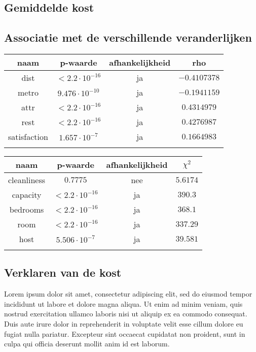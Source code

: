 \documentclass[a4paper]{kulakarticle}
\begin{document}
	\subsection{Gemiddelde kost}
	
	
	
	\subsection{Associatie met de verschillende veranderlijken}
	
	
	
	\begin{tabular}{c|c|c|c }
		naam & p-waarde & afhankelijkheid & rho\\
		\hline
		\hline
		dist & $< 2.2 \cdot 10^{-16} $&ja& $-0.4107378$ \\
		metro &$ 9.476\cdot 10^{-10}$& ja& $-0.1941159$ \\ 
		attr &$ < 2.2\cdot 10^{-16}$& ja&$0.4314979 $ \\
		rest &$ < 2.2\cdot 10^{-16}$& ja&$0.4276987 $ \\
		satisfaction &$ 1.657\cdot 10^{-7}$& ja&$0.1664983 $ \\
		
		\label{continue variabelen afhankelijkheid}
		
	\end{tabular}
	
	\begin{tabular}{c|c|c|c }
		naam & p-waarde & afhankelijkheid & $\chi ^2$\\
		\hline
		\hline
		cleanliness & $0.7775$&nee& $5.6174$ \\
		capacity &$ < 2.2\cdot 10^{-16}$& ja& $390.3$ \\ 
		bedrooms &$ < 2.2\cdot 10^{-16}$& ja&$368.1 $ \\
		room &$ < 2.2\cdot 10^{-16}$& ja&$ 337.29$ \\
		host &$ 5.506\cdot 10^{-7}$& ja&$39.581 $ \\
		\label{discrete variabelen afhankelijkheid}
	\end{tabular}
	
	
	\subsection{Verklaren van de kost}
	Lorem ipsum dolor sit amet, consectetur adipiscing elit, sed do eiusmod tempor incididunt ut labore et dolore magna aliqua. Ut enim ad minim veniam, quis nostrud exercitation ullamco laboris nisi ut aliquip ex ea commodo consequat. Duis aute irure dolor in reprehenderit in voluptate velit esse cillum dolore eu fugiat nulla pariatur. Excepteur sint occaecat cupidatat non proident, sunt in culpa qui officia deserunt mollit anim id est laborum.
	
\end{document}
